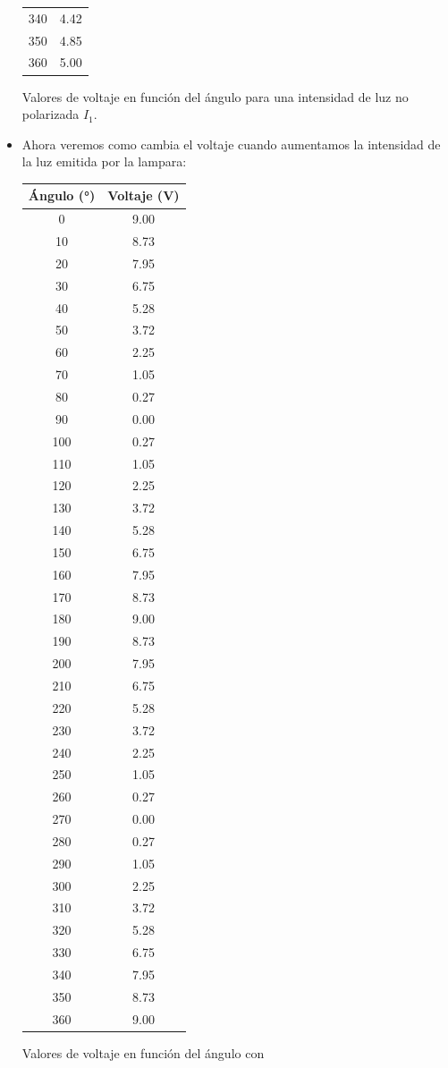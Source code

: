 \documentclass{article}
\begin{document}
\begin{multicols}{2}
\begin{itemize}
\begin{table}[h]
\begin{tabular}{cc}
			340 & 4.42 \\
			350 & 4.85 \\
			360 & 5.00 \\
			\bottomrule
		\end{tabular}
	\end{table}
	\begin{center}
		Valores de voltaje en función del ángulo para una intensidad de luz no polarizada $I_1$.
	\end{center}
	\item Ahora veremos como cambia el voltaje cuando aumentamos la intensidad de la luz emitida por la lampara:
	\begin{table}[h]
		\centering
		\begin{tabular}{cc}
			\toprule
			\textbf{Ángulo (°)} & \textbf{Voltaje (V)} \\
			\midrule
			0   & 9.00 \\
			10  & 8.73 \\
			20  & 7.95 \\
			30  & 6.75 \\
			40  & 5.28 \\
			50  & 3.72 \\
			60  & 2.25 \\
			70  & 1.05 \\
			80  & 0.27 \\
			90  & 0.00 \\
			100 & 0.27 \\
			110 & 1.05 \\
			120 & 2.25 \\
			130 & 3.72 \\
			140 & 5.28 \\
			150 & 6.75 \\
			160 & 7.95 \\
			170 & 8.73 \\
			180 & 9.00 \\
			190 & 8.73 \\
			200 & 7.95 \\
			210 & 6.75 \\
			220 & 5.28 \\
			230 & 3.72 \\
			240 & 2.25 \\
			250 & 1.05 \\
			260 & 0.27 \\
			270 & 0.00 \\
			280 & 0.27 \\
			290 & 1.05 \\
			300 & 2.25 \\
			310 & 3.72 \\
			320 & 5.28 \\
			330 & 6.75 \\
			340 & 7.95 \\
			350 & 8.73 \\
			360 & 9.00 \\
			\bottomrule
		\end{tabular}
	\end{table}
	Valores de voltaje en función del ángulo con 
	

\end{itemize}
\end{multicols}
\end{document}
